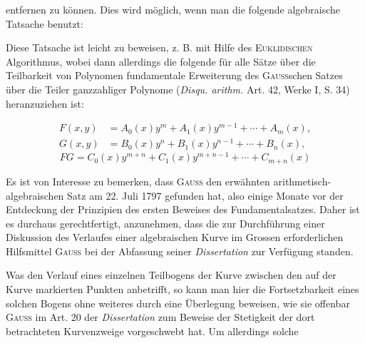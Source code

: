 entfernen zu können. Dies wird möglich, wenn man die folgende algebraische
Tatsache benutzt:
\par
{}
\par
Diese Tatsache ist leicht zu beweisen, z. B. mit Hilfe des \textsc{Euklidischen}
Algorithmus, wobei dann allerdings die folgende für alle Sätze über die Teilbarkeit
von Polynomen fundamentale Erweiterung des \textsc{Gauss}schen Satzes über
die Teiler ganzzahliger Polynome (\textit{Disqu. arithm.} Art. 42, Werke I, S. 34)
heranzuziehen ist:
\par\clearpage{}
\[
\begin{aligned}
F(x,y)&=A_0(x)y^m+A_1(x)y^{m-1}+\cdots+A_m(x),\\
G(x,y)&=B_0(x)y^n+B_1(x)y^{n-1}+\cdots+B_n(x),
\end{aligned}
\]
\[
FG=C_0(x)y^{m+n}+C_1(x)y^{m+n-1}+\cdots+C_{m+n}(x)
\]
\par
Es ist von Interesse zu bemerken, dass \textsc{Gauss} den erwähnten arithmetisch-algebraischen
Satz am 22. Juli 1797 gefunden hat, also einige Monate vor der
Entdeckung der Prinzipien des ersten Beweises des Fundamentalsatzes. Daher
ist es durchaus gerechtfertigt, anzunehmen, dass die zur Durchführung einer
Diskussion des Verlaufes einer algebraischen Kurve im Grossen erforderlichen
Hilfsmittel \textsc{Gauss} bei der Abfassung seiner \textit{Dissertation} zur Verfügung standen.
\par
Was den Verlauf eines einzelnen Teilbogens der Kurve zwischen den
auf der Kurve markierten Punkten anbetrifft, so kann man hier die Fortsetzbarkeit
eines solchen Bogens ohne weiteres durch eine Überlegung beweisen,
wie sie offenbar \textsc{Gauss} im Art. 20 der \textit{Dissertation} zum Beweise der Stetigkeit
der dort betrachteten Kurvenzweige vorgeschwebt hat. Um allerdings solche
